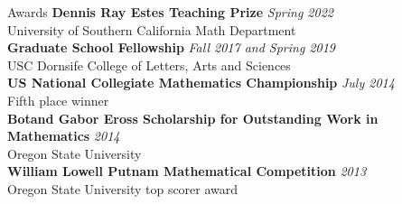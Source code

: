 \documentclass{cv} %
\begin{document}
\begin{rSection}{Awards}
  \textbf{Dennis Ray Estes Teaching Prize} \hfill \textit{Spring 2022}
  \\ University of Southern California Math Department
  \\
  \textbf{Graduate School Fellowship} \hfill \textit{Fall 2017 and Spring 2019}
  \\ USC Dornsife College of Letters, Arts and Sciences
  \\
  \textbf{US National Collegiate Mathematics Championship} \hfill \textit{July 2014}
  \\ Fifth place winner
  \\
  \textbf{Botand Gabor Eross Scholarship for Outstanding Work in Mathematics} \hfill \textit{2014}
  \\ Oregon State University
  \\
  \textbf{William Lowell Putnam Mathematical Competition} \hfill \textit{2013}
  \\ Oregon State University top scorer award
  \\

\end{rSection}
\end{document}
